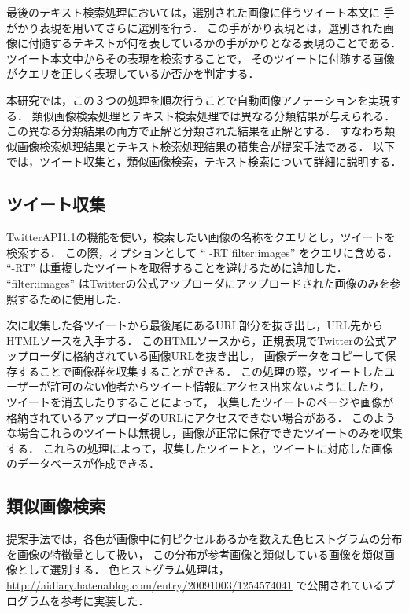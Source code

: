 \documentclass{deimj}
\begin{document}
最後のテキスト検索処理においては，選別された画像に伴うツイート本文に
手がかり表現を用いてさらに選別を行う．
この手がかり表現とは，選別された画像に付随するテキストが何を表しているかの手がかりとなる表現のことである．
ツイート本文中からその表現を検索することで，
そのツイートに付随する画像がクエリを正しく表現しているか否かを判定する．

本研究では，この３つの処理を順次行うことで自動画像アノテーションを実現する．
類似画像検索処理とテキスト検索処理では異なる分類結果が与えられる．
この異なる分類結果の両方で正解と分類された結果を正解とする．
すなわち類似画像検索処理結果とテキスト検索処理結果の積集合が提案手法である．
以下では，ツイート収集と，類似画像検索，テキスト検索について詳細に説明する．

\subsection{ツイート収集}
\label{sec:tweetCollect}
TwitterAPI1.1の機能を使い，検索したい画像の名称をクエリとし，ツイートを検索する．
この際，オプションとして “ -RT filter:images” をクエリに含める．
“-RT” は重複したツイートを取得することを避けるために追加した．
“filter:images” はTwitterの公式アップローダにアップロードされた画像のみを参照するために使用した．

次に収集した各ツイートから最後尾にあるURL部分を抜き出し，URL先からHTMLソースを入手する．
このHTMLソースから，正規表現でTwitterの公式アップローダに格納されている画像URLを抜き出し，
画像データをコピーして保存することで画像群を収集することができる．
この処理の際，ツイートしたユーザーが許可のない他者からツイート情報にアクセス出来ないようにしたり，
ツイートを消去したりすることによって，
収集したツイートのページや画像が格納されているアップローダのURLにアクセスできない場合がある．
このような場合これらのツイートは無視し，画像が正常に保存できたツイートのみを収集する．
これらの処理によって，収集したツイートと，ツイートに対応した画像のデータベースが作成できる．


\subsection{類似画像検索}
\label{sec:similar}

提案手法では，各色が画像中に何ピクセルあるかを数えた色ヒストグラムの分布を画像の特徴量として扱い，
この分布が参考画像と類似している画像を類似画像として選別する\cite{Datta08imageretrieval:}．
色ヒストグラム処理は，
\url{http://aidiary.hatenablog.com/entry/20091003/1254574041}
で公開されているプログラムを参考に実装した．
\end{document}
